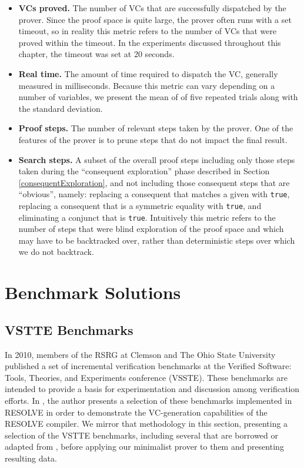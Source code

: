 \begin{itemize}
	\item \textbf{VCs proved.}  The number of VCs that are successfully dispatched by the prover.  Since the proof space is quite large, the prover often runs with a set timeout, so in reality this metric refers to the number of VCs that were proved within the timeout.  In the experiments discussed throughout this chapter, the timeout was set at 20 seconds.
	\item \textbf{Real time.}  The amount of time required to dispatch the VC, generally measured in milliseconds.  Because this metric can vary depending on a number of variables, we present the mean of of five repeated trials along with the standard deviation.
	\item \textbf{Proof steps.}  The number of relevant steps taken by the prover.  One of the features of the prover is to prune steps that do not impact the final result.
	\item \textbf{Search steps.}  A subset of the overall proof steps including only those steps taken during the ``consequent exploration'' phase described in Section \ref{consequentExploration}, and not including those consequent steps that are ``obvious'', namely: replacing a consequent that matches a given with \texttt{true}, replacing a consequent that is a symmetric equality with \texttt{true}, and eliminating a conjunct that is \texttt{true}.  Intuitively this metric refers to the number of steps that were blind exploration of the proof space and which may have to be backtracked over, rather than deterministic steps over which we do not backtrack.
\end{itemize}


\section{Benchmark Solutions\label{canProve}}

	\subsection{VSTTE Benchmarks}
In 2010, members of the RSRG at Clemson and The Ohio State University published a set of incremental verification benchmarks at the Verified Software: Tools, Theories, and Experiments conference (VSSTE)\cite{Benchmarks}.  These benchmarks are intended to provide a basis for experimentation and discussion among verification efforts.  In \cite{hartonDissertation}, the author presents a selection of these benchmarks implemented in RESOLVE in order to demonstrate the VC-generation capabilities of the RESOLVE compiler.  We mirror that methodology in this section, presenting a selection of the VSTTE benchmarks, including several that are borrowed or adapted from \cite{hartonDissertation}, before applying our minimalist prover to them and presenting resulting data.

